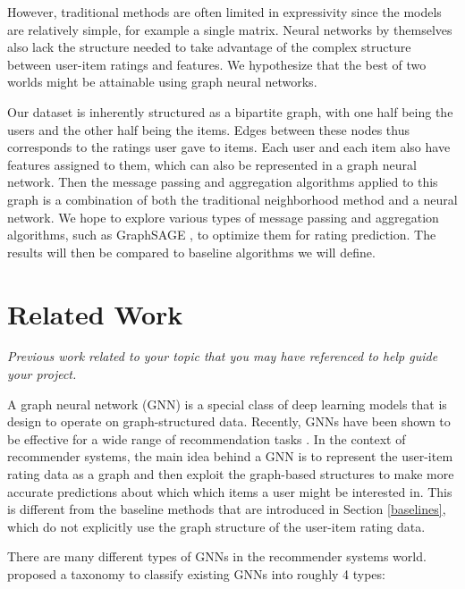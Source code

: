 \documentclass{article}
\begin{document}
However, traditional methods are often limited in expressivity since the models are relatively simple, for example a single matrix. Neural networks by themselves also lack the structure needed to take advantage of the complex structure between user-item ratings and features. We hypothesize that the best of two worlds might be attainable using graph neural networks.

Our dataset is inherently structured as a bipartite graph, with one half being the users and the other half being the items. Edges between these nodes thus corresponds to the ratings user gave to items. Each user and each item also have features assigned to them, which can also be represented in a graph neural network. Then the message passing and aggregation algorithms applied to this graph is a combination of both the traditional neighborhood method and a neural network. We hope to explore various types of message passing and aggregation algorithms, such as GraphSAGE \cite{graphsage}, to optimize them for rating prediction. The results will then be compared to baseline algorithms we will define.


\section{Related Work} 

\textit{Previous work related to your topic that you may have referenced to help guide your project.}

A graph neural network (GNN) is a special class of deep learning models that is design to operate on graph-structured data. Recently, GNNs have been shown to be effective for a wide range of recommendation tasks \cite{survey}. In the context of recommender systems, the main idea behind a GNN is to represent the user-item rating data as a graph and then exploit the graph-based structures to make more accurate predictions about which which items a user might be interested in. This is different from the baseline methods that are introduced in Section \ref{baselines}, which do not explicitly use the graph structure of the user-item rating data.

There are many different types of GNNs in the recommender systems world. \cite{survey} proposed a taxonomy to classify existing GNNs into roughly 4 types:
\end{document}
